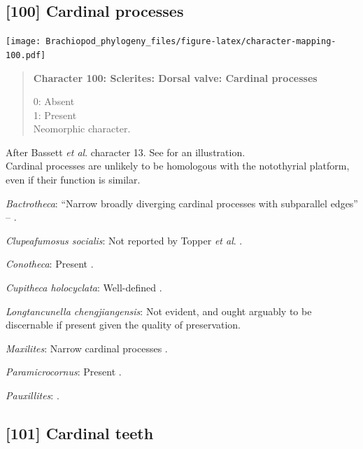 \documentclass[openany]{book}
\begin{document}
\subsection*{{[}100{]} Cardinal processes}\label{cardinal-processes}

\texttt{[image: Brachiopod\_phylogeny\_files/figure-latex/character-mapping-100.pdf]}

\begin{quote}
\textbf{Character 100: Sclerites: Dorsal valve: Cardinal processes}

0: Absent\\
1: Present\\
Neomorphic character.
\end{quote}

After Bassett \emph{et al}.
\citeyearpar{Bassett2001Functionalmorphology} character 13. See
\citet{MartiMus2005} for an illustration.\\
Cardinal processes are unlikely to be homologous with the notothyrial
platform, even if their function is similar.

\hypertarget{Bactrotheca-coding-100}{}
\emph{Bactrotheca}: ``Narrow broadly diverging cardinal processes with
subparallel edges'' -- \citet{Valent2012}.

\hypertarget{Clupeafumosus_socialis-coding-100}{}
\emph{Clupeafumosus socialis}: Not reported by Topper \emph{et al}.
\citeyearpar{Topper2013Reappraisalof}.

\hypertarget{Conotheca-coding-100}{}
\emph{Conotheca}: Present \citep{Wrona2003}.

\hypertarget{Cupitheca_holocyclata-coding-100}{}
\emph{Cupitheca holocyclata}: Well-defined \citep{Skovsted2016}.

\hypertarget{Longtancunella_chengjiangensis-coding-100}{}
\emph{Longtancunella chengjiangensis}: Not evident, and ought arguably
to be discernable if present given the quality of preservation.

\hypertarget{Maxilites-coding-100}{}
\emph{Maxilites}: Narrow cardinal processes \citep{Marek1972}.

\hypertarget{Paramicrocornus-coding-100}{}
\emph{Paramicrocornus}: Present \citep{Zhang2018Ahyolithid}.

\hypertarget{Pauxillites-coding-100}{}
\emph{Pauxillites}: \citet{Marek1966}.

\subsection*{{[}101{]} Cardinal teeth}\label{cardinal-teeth}
\end{document}

